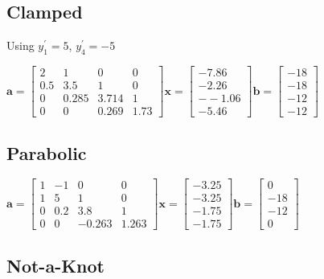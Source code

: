 \documentclass[12pt]{article}
\begin{document}
  \subsection*{Clamped}
  Using $y_1^{\prime}=5$, $y_4^{\prime}=-5$

  $
  \bm{a} = \left[
  \begin{matrix}
  2 & 1 & 0 & 0 \\
  0.5 & 3.5 & 1 & 0 \\
  0 & 0.285 & 3.714 & 1 \\
  0 & 0 & 0.269 & 1.73
  \end{matrix}
  \right]
  \bm{x} = \left[
  \begin{matrix}
  -7.86    \\
  -2.26 \\
  --1.06 \\
  -5.46
  \end{matrix}
  \right]
  \bm{b} = \left[
  \begin{matrix}
  -18   \\
  -18 \\
  -12 \\
  -12
  \end{matrix}
  \right]
  $


  \subsection*{Parabolic}

  $
  \bm{a} = \left[
  \begin{matrix}
  1 & -1 & 0 & 0 \\
  1 & 5 & 1 & 0 \\
  0 & 0.2 & 3.8 & 1 \\
  0 & 0 & -0.263 & 1.263
  \end{matrix}
  \right]
  \bm{x} = \left[
  \begin{matrix}
  -3.25     \\
  -3.25 \\
  -1.75 \\
  -1.75
  \end{matrix}
  \right]
  \bm{b} = \left[
  \begin{matrix}
  0   \\
  -18 \\
  -12 \\
  0
  \end{matrix}
  \right]
  $

  \subsection*{Not-a-Knot}
\end{document}
